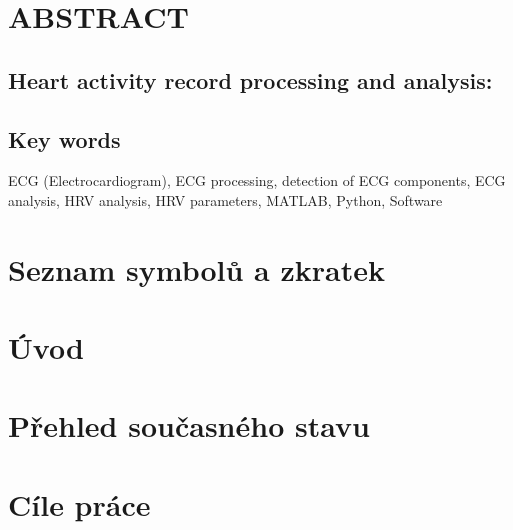 \documentclass[a4paper,12pt,czech]{article}   %
\numberwithin{equation}{section}        %
\newcommand{\nazevENG}{Heart activity record processing and analysis}
\begin{document}
\null\vfill
\section*{ABSTRACT}
\subsection*{\nazevENG:}

\subsection*{Key words}
ECG (Electrocardiogram), ECG processing, detection of ECG components, ECG analysis, HRV analysis, HRV parameters, MATLAB, Python, Software
\clearpage

\pagestyle{plain}	%

\tableofcontents			%

\clearpage

\section*{Seznam symbolů a zkratek} %

\clearpage






\section{Úvod}

\clearpage

\section{Přehled současného stavu}

\clearpage

\section{Cíle práce}
\label{section:thesis_aims}

\clearpage
\end{document}
